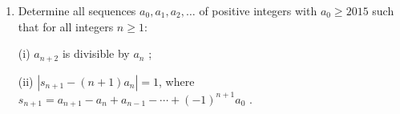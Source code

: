 \documentclass[11pt,a4paper]{article}
\begin{document}
\begin{enumerate}
	\item Determine all sequences $a_0 , a_1 , a_2 , \ldots$ of positive integers with $a_0 \ge 2015$ such that for all integers $n\ge 1$:
	
	(i) $a_{n+2}$ is divisible by $a_n$ ;
	
	(ii) $|s_{n+1} - (n + 1)a_n | = 1$, where $s_{n+1} = a_{n+1} - a_n + a_{n-1} - \cdots + (-1)^{n+1} a_0$ .
	
\end{enumerate}
\end{document}
